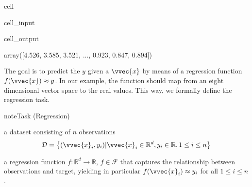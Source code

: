 \documentclass[letterpaper,10pt,english]{jupyterBook}
\begin{document}
\begin{sphinxuseclass}{cell}\begin{sphinxVerbatimInput}

\begin{sphinxuseclass}{cell_input}
\begin{sphinxVerbatim}[commandchars=\\\{\}]
\end{sphinxVerbatim}

\end{sphinxuseclass}\end{sphinxVerbatimInput}
\begin{sphinxVerbatimOutput}

\begin{sphinxuseclass}{cell_output}
\begin{sphinxVerbatim}[commandchars=\\\{\}]
array([4.526, 3.585, 3.521, ..., 0.923, 0.847, 0.894])
\end{sphinxVerbatim}

\end{sphinxuseclass}\end{sphinxVerbatimOutput}

\end{sphinxuseclass}
\sphinxAtStartPar
The goal is to predict the  \(y\) given a  \(\vvec{x}\) by means of a regression function
\(f(\vvec{x})\approx y\). In our example, the function should map from an eight dimensional vector space to the real values. This way, we formally define the regression task.

\begin{sphinxadmonition}{note}{Task (Regression)}

\sphinxAtStartPar
{} a dataset consisting of \(n\) observations
\begin{equation*}
\begin{split}\mathcal{D}=\left\{(\vvec{x}_i,y_i)\vert \vvec{x}_{i}\in\mathbb{R}^{d}, y_i\in\mathbb{R}, 1\leq i \leq n\right\}\end{split}
\end{equation*}

\sphinxAtStartPar
{} a regression function \(f:\mathbb{R}^ d\rightarrow \mathbb{R}\), \(f\in\mathcal{F}\) that captures the relationship between observations and target, yielding in particular  \(f(\vvec{x}_i)\approx y_i\) for all \(1\leq i \leq n\).
\end{sphinxadmonition}
\end{document}
